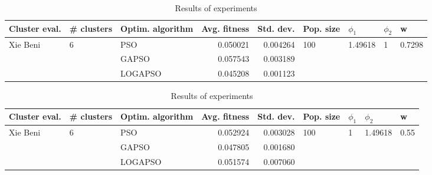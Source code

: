 \documentclass{article}
\begin{document}
\begin{table}
\centering
\caption{Results of experiments}
\begin{tabular}{lllrrllll}
\toprule
            Cluster eval. &        \# clusters & Optim. algorithm &  Avg. fitness &  Std. dev. &            Pop. size &               $\phi_{1}$ &         $\phi_{2}$ &                       w \\
\midrule
\multirow{3}{*}{Xie Beni} & \multirow{3}{*}{6} &              PSO &      0.050021 &   0.004264 & \multirow{3}{*}{100} & \multirow{3}{*}{1.49618} & \multirow{3}{*}{1} & \multirow{3}{*}{0.7298} \\
                          &                    &            GAPSO &      0.057543 &   0.003189 &                      &                          &                    &                         \\
                          &                    &          LOGAPSO &      0.045208 &   0.001123 &                      &                          &                    &                         \\
\bottomrule
\end{tabular}
\end{table}
\begin{table}
\centering
\caption{Results of experiments}
\begin{tabular}{lllrrllll}
\toprule
            Cluster eval. &        \# clusters & Optim. algorithm &  Avg. fitness &  Std. dev. &            Pop. size &         $\phi_{1}$ &               $\phi_{2}$ &                     w \\
\midrule
\multirow{3}{*}{Xie Beni} & \multirow{3}{*}{6} &              PSO &      0.052924 &   0.003028 & \multirow{3}{*}{100} & \multirow{3}{*}{1} & \multirow{3}{*}{1.49618} & \multirow{3}{*}{0.55} \\
                          &                    &            GAPSO &      0.047805 &   0.001680 &                      &                    &                          &                       \\
                          &                    &          LOGAPSO &      0.051574 &   0.007060 &                      &                    &                          &                       \\
\bottomrule
\end{tabular}
\end{table}
\end{document}
